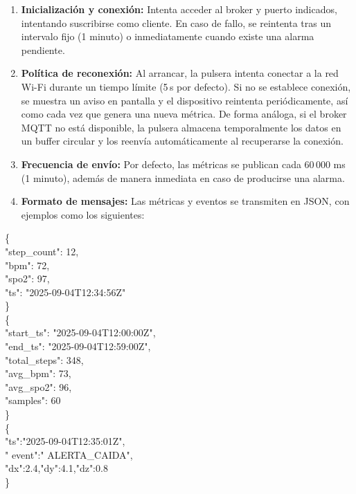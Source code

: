\documentclass[12pt, a4paper]{article}
\begin{document}
	\begin{enumerate}
		\item \textbf{Inicialización y conexión:} Intenta acceder al broker y puerto indicados, intentando suscribirse como cliente. En caso de fallo, se reintenta tras un intervalo fijo (1 minuto) o inmediatamente cuando existe una alarma pendiente.
		\item \textbf{Política de reconexión:} Al arrancar, la pulsera intenta conectar a la red Wi-Fi durante un tiempo límite (5\,s por defecto). Si no se establece conexión, se muestra un aviso en pantalla y el dispositivo reintenta periódicamente, así como cada vez que genera una nueva métrica. De forma análoga, si el broker MQTT no está disponible, la pulsera almacena temporalmente los datos en un buffer circular y los reenvía automáticamente al recuperarse la conexión.
		\item \textbf{Frecuencia de envío:} Por defecto, las métricas se publican cada 60\,000 ms (1 minuto), además de manera inmediata en caso de producirse una alarma.
		\item \textbf{Formato de mensajes:} Las métricas y eventos se transmiten en JSON, con ejemplos como los siguientes:
	\end{enumerate}

	{\ttfamily\small
		\noindent
		\{\\
		\quad "step\_count": 12,\\
		\quad "bpm": 72,\\
		\quad "spo2": 97,\\
		\quad "ts": "2025-09-04T12:34:56Z"\\
		\}\\[6pt]
		\noindent
		\{\\
		\quad "start\_ts": "2025-09-04T12:00:00Z",\\
		\quad "end\_ts": "2025-09-04T12:59:00Z",\\
		\quad "total\_steps": 348,\\
		\quad "avg\_bpm": 73,\\
		\quad "avg\_spo2": 96,\\
		\quad "samples": 60\\
		\}\\[6pt]
		\noindent
		\{\\
		\quad "ts":"2025-09-04T12:35:01Z",\\
		\quad " event":" ALERTA\_CAIDA",\\
		\quad "dx":2.4,"dy":4.1,"dz":0.8\\
		\}
	}
\end{document}
